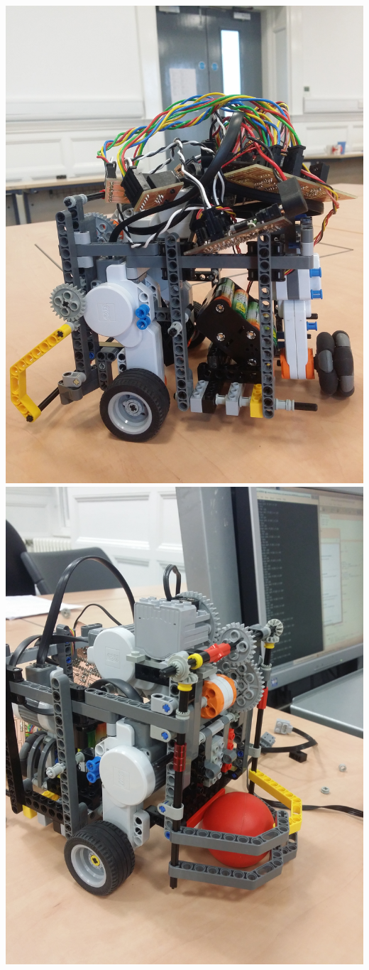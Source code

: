 \documentclass[12pt]{article}
\begin{document}
	\includegraphics[scale=.07, angle = -90]{robot1.jpg} 
	\includegraphics[scale=.07, angle = -90]{robot2.jpg}
	\bigskip
\end{document}
